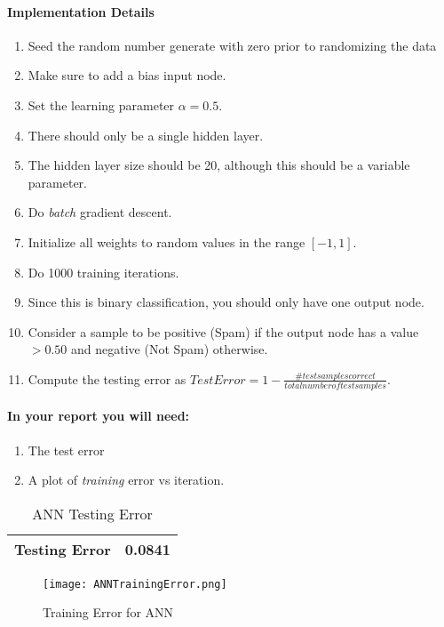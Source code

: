 \documentclass[12pt]{article}
\begin{document}
\paragraph{Implementation Details}
\begin{enumerate}
\item Seed the random number generate with zero prior to randomizing the data
\item Make sure to add a bias input node.
\item Set the learning parameter $\alpha=0.5$.
\item There should only be a single hidden layer.
\item The hidden layer size should be 20, although this should be a variable parameter.
\item Do \emph{batch} gradient descent.
\item Initialize all weights to random values in the range $[-1,1]$.
\item Do 1000 training iterations.
\item Since this is binary classification, you should only have one output node.
\item Consider a sample to be positive (Spam) if the output node has a value $>0.50$ and negative (Not Spam) otherwise.
\item Compute the testing error as $TestError=1-\frac{\#test samples correct}{total number of test samples}$.
\end{enumerate}


\paragraph{In your report you will need:}
\begin{enumerate}
\item The test error
\item A plot of \emph{training} error vs iteration.
\end{enumerate}

\begin{table}[h]
\begin{center}
\begin{tabular}{|l|l|}
\hline
Testing Error & 0.0841\\
\hline
\end{tabular}
\caption{ANN Testing Error}
\end{center}
\end{table}

\begin{figure}[H]
\begin{center}
\texttt{[image: ANNTrainingError.png]}
\caption{Training Error for ANN}
\end{center}
\end{figure}
\end{document}
